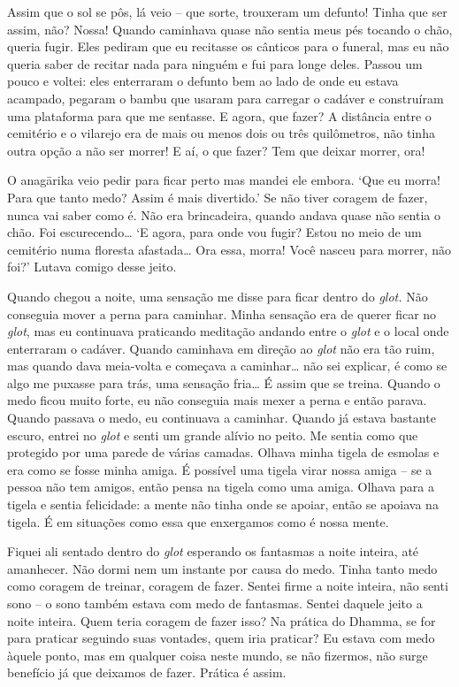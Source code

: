Assim que o sol se pôs, lá veio -- que sorte, trouxeram um defunto!
Tinha que ser assim, não? Nossa! Quando caminhava quase não sentia meus
pés tocando o chão, queria fugir. Eles pediram que eu recitasse os
cânticos para o funeral, mas eu não queria saber de recitar nada para
ninguém e fui para longe deles. Passou um pouco e voltei: eles
enterraram o defunto bem ao lado de onde eu estava acampado, pegaram o
bambu que usaram para carregar o cadáver e construíram uma plataforma
para que me sentasse. E agora, que fazer? A distância entre o cemitério
e o vilarejo era de mais ou menos dois ou três quilômetros, não tinha
outra opção a não ser morrer! E aí, o que fazer? Tem que deixar morrer,
ora!

O anagārika veio pedir para ficar perto mas mandei ele embora. `Que eu
morra! Para que tanto medo? Assim é mais divertido.' Se não tiver
coragem de fazer, nunca vai saber como é. Não era brincadeira, quando
andava quase não sentia o chão. Foi escurecendo\ldots{} `E agora, para
onde vou fugir? Estou no meio de um cemitério numa floresta
afastada\ldots{} Ora essa, morra! Você nasceu para morrer, não foi?'
Lutava comigo desse jeito.

Quando chegou a noite, uma sensação me disse para ficar dentro do
\emph{glot.} Não conseguia mover a perna para caminhar. Minha sensação
era de querer ficar no \emph{glot}, mas eu continuava praticando
meditação andando entre o \emph{glot} e o local onde enterraram o
cadáver. Quando caminhava em direção ao \emph{glot} não era tão ruim,
mas quando dava meia-volta e começava a caminhar\ldots{} não sei
explicar, é como se algo me puxasse para trás, uma sensação fria\ldots{}
É assim que se treina. Quando o medo ficou muito forte, eu não conseguia
mais mexer a perna e então parava. Quando passava o medo, eu continuava
a caminhar. Quando já estava bastante escuro, entrei no \emph{glot} e
senti um grande alívio no peito. Me sentia como que protegido por uma
parede de várias camadas. Olhava minha tigela de esmolas e era como se
fosse minha amiga. É possível uma tigela virar nossa amiga -- se a
pessoa não tem amigos, então pensa na tigela como uma amiga. Olhava para
a tigela e sentia felicidade: a mente não tinha onde se apoiar, então se
apoiava na tigela. É em situações como essa que enxergamos como é nossa
mente.

Fiquei ali sentado dentro do \emph{glot} esperando os fantasmas a noite
inteira, até amanhecer. Não dormi nem um instante por causa do medo.
Tinha tanto medo como coragem de treinar, coragem de fazer. Sentei firme
a noite inteira, não senti sono -- o sono também estava com medo de
fantasmas. Sentei daquele jeito a noite inteira. Quem teria coragem de
fazer isso? Na prática do Dhamma, se for para praticar seguindo suas
vontades, quem iria praticar? Eu estava com medo àquele ponto, mas em
qualquer coisa neste mundo, se não fizermos, não surge benefício já que
deixamos de fazer. Prática é assim.

